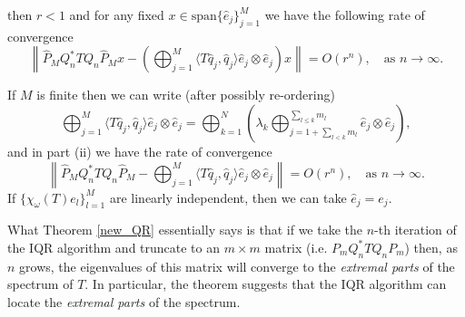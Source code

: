 \documentclass[a4paper,10pt]{article}
\begin{document}
\begin{theorem}
\begin{itemize}
$$$$
then $r<1$ and for any fixed $x\in \mathrm{span}\{\hat e_j\}_{j=1}^M$ we have the following rate of convergence
\begin{equation}
\label{when_M_finite2}
\left\|\widehat P_{M} Q_n^*TQ_n \widehat P_{M}x-\left(\bigoplus_{j=1}^{M} \langle T\hat q_j,\hat q_j\rangle\hat e_j \otimes \hat e_j \right)x\right\|= O(r^n),\quad \text{as }n\rightarrow\infty.
\end{equation}
\end{itemize}
If $M$ is finite then we can write (after possibly re-ordering)
\begin{equation}
\label{when_M_finite}
\bigoplus_{j=1}^{M} \langle T\hat q_j,\hat q_j\rangle\hat e_j \otimes \hat e_j =\bigoplus_{k=1}^N\left(\lambda_k\bigoplus_{j=1+\sum_{l<k}m_l}^{\sum_{l\leq k}m_l} \hat e_j \otimes \hat e_j \right),
\end{equation}
and in part (ii) we have the rate of convergence
\begin{equation}\label{eq:big_O}
\left\|\widehat P_{M} Q_n^*TQ_n\widehat P_{M}-\bigoplus_{j=1}^{M} \langle T\hat q_j,\hat q_j\rangle\hat e_j \otimes \hat e_j \right\|= O(r^n),\quad \text{as }n\rightarrow\infty.
\end{equation}
If $\{\chi_{\omega}(T)e_l\}_{l=1}^M$ are linearly independent, then we can take $\hat e_j=e_j$.
\end{theorem}

\begin{remark}
What Theorem \ref{new_QR} essentially says is that if we take the $n$-th iteration of the IQR algorithm and truncate to an $m\times m$ matrix (i.e. $P_mQ_n^*TQ_nP_m$) then, as $n$ grows, the eigenvalues of this matrix will converge to the \textit{extremal parts} of the spectrum of $T$. In particular, the theorem suggests that the IQR algorithm can locate the \textit{extremal parts} of the spectrum.
\end{remark}
\end{document}
